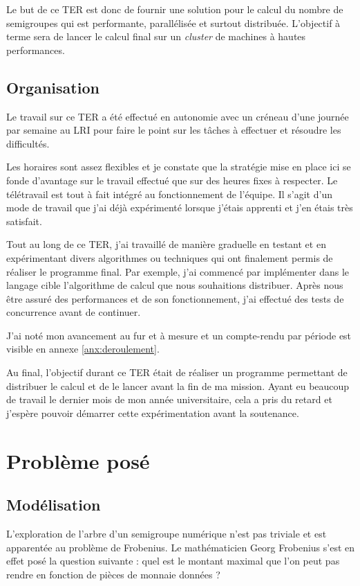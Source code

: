\documentclass[12pt,a4paper]{report}
\begin{document}
Le but de ce TER est donc de fournir une solution pour le calcul du nombre de semigroupes qui est performante, parallélisée et surtout distribuée. L'objectif à terme sera de lancer le calcul final sur un \emph{cluster} de machines à hautes performances.

\section{Organisation}
Le travail sur ce TER a été effectué en autonomie avec un créneau d'une journée par semaine au LRI pour faire le point sur les tâches à effectuer et résoudre les difficultés.

Les horaires sont assez flexibles et je constate que la stratégie mise en place ici se fonde d'avantage sur le travail effectué que sur des heures fixes à respecter. Le télétravail est tout à fait intégré au fonctionnement de l'équipe. Il s'agit d'un mode de travail que j'ai déjà expérimenté lorsque j'étais apprenti et j'en étais très satisfait.

Tout au long de ce TER, j'ai travaillé de manière graduelle en testant et en expérimentant divers algorithmes ou techniques qui ont finalement permis de réaliser le programme final. Par exemple, j'ai commencé par implémenter dans le langage cible l'algorithme de calcul que nous souhaitions distribuer. Après nous être assuré des performances et de son fonctionnement, j'ai effectué des tests de concurrence avant de continuer.

J'ai noté mon avancement au fur et à mesure et un compte-rendu par période est visible en annexe \ref{anx:deroulement}.

Au final, l'objectif durant ce TER était de réaliser un programme permettant de distribuer le calcul et de le lancer avant la fin de ma mission. Ayant eu beaucoup de travail le dernier mois de mon année universitaire, cela a pris du retard et j'espère pouvoir démarrer cette expérimentation avant la soutenance.

\chapter{Problème posé}

\section{Modélisation}
L'exploration de l'arbre d'un semigroupe numérique n'est pas triviale et est apparentée au problème de Frobenius. Le mathématicien Georg Frobenius s'est en effet posé la question suivante : quel est le montant maximal que l'on peut pas rendre en fonction de pièces de monnaie données ?
\end{document}
